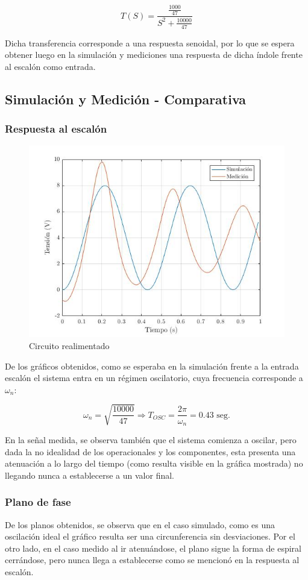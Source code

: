 \documentclass{article}
\begin{document}
\[
T(S) = \frac{\frac{1000}{47}}{S^2 + \frac{10000}{47}}
\]

Dicha transferencia corresponde a una respuesta senoidal, por lo que se espera obtener luego en la simulación y mediciones una respuesta de dicha índole frente al escalón como entrada.

\subsection{Simulación y Medición - Comparativa}

\subsubsection{Respuesta al escalón}

\begin{figure}[H]
\centering
\includegraphics[width=0.7\linewidth]{../graficos/escalonSinK2.jpg}
\caption{Circuito realimentado}
\label{fig:escalonSinK2}
\end{figure}

De los gráficos obtenidos, como se esperaba en la simulación frente a la entrada escalón el sistema entra en un régimen oscilatorio, cuya frecuencia corresponde a $\omega_n$:

\[
\omega_n = \sqrt{\frac{10000}{47}} \Longrightarrow T_{OSC} = \frac{2 \pi}{\omega_n} = \textrm{0.43 seg.}
\]

En la señal medida, se observa también que el sistema comienza a oscilar, pero dada la no idealidad de los operacionales y los componentes, esta presenta una atenuación a lo largo del tiempo (como resulta visible en la gráfica mostrada) no llegando nunca a establecerse a un valor final.

\subsubsection{Plano de fase}


De los planos obtenidos, se observa que en el caso simulado, como es una oscilación ideal el gráfico resulta ser una circunferencia sin desviaciones. Por el otro lado, en el caso medido al ir atenuándose, el plano sigue la forma de espiral cerrándose, pero nunca llega a establecerse como se mencionó en la respuesta al escalón.
\end{document}
